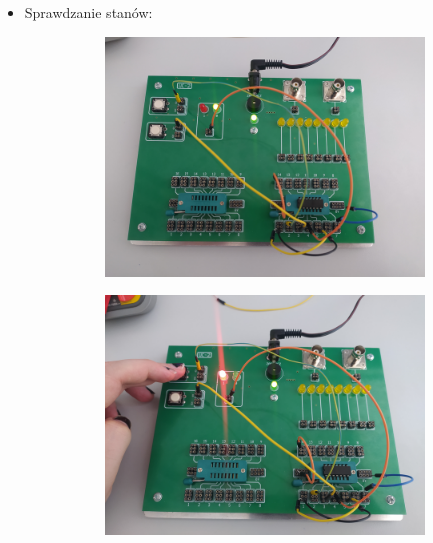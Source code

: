 \begin{itemize}
            \item Sprawdzanie stanów:
                \begin{figure}[H]
                    \centering
                        \begin{subfigure}[h]{0.4\textwidth}
                            \includegraphics[width=\textwidth]{img/NOR/funkcje/1652306732459_scaled.png}
                        \end{subfigure}
                        \begin{subfigure}[h]{0.4\textwidth}
                            \includegraphics[width=\textwidth]{img/NOR/funkcje/1652306732450_scaled.png}
                        \end{subfigure}

\end{figure}
\end{itemize}

